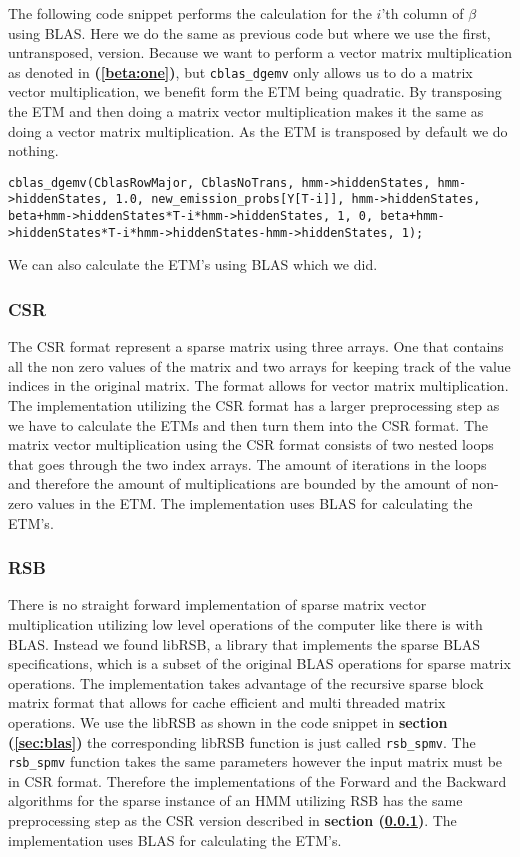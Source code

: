 The following code snippet performs the calculation for the $i$'th column of $\beta$ using BLAS. Here we do the same as previous code but where we use the first, untransposed, version. Because we want to perform a vector matrix multiplication as denoted in \textbf{(\ref{beta:one})}, but \texttt{cblas\_dgemv} only allows us to do a matrix vector multiplication, we benefit form the ETM being quadratic. By transposing the ETM and then doing a matrix vector multiplication makes it the same as doing a vector matrix multiplication. As the ETM is transposed by default we do nothing.
\begin{lstlisting}[style=CStyle]
cblas_dgemv(CblasRowMajor, CblasNoTrans, hmm->hiddenStates, hmm->hiddenStates, 1.0, new_emission_probs[Y[T-i]], hmm->hiddenStates, beta+hmm->hiddenStates*T-i*hmm->hiddenStates, 1, 0, beta+hmm->hiddenStates*T-i*hmm->hiddenStates-hmm->hiddenStates, 1);
\end{lstlisting}

We can also calculate the ETM's using BLAS which we did.

\subsubsection{CSR}\label{sec:csr}

The CSR format represent a sparse matrix using three arrays. One that contains all the non zero values of the matrix and two arrays for keeping track of the value indices in the original matrix. The format allows for vector matrix multiplication. The implementation utilizing the CSR format has a larger preprocessing step as we have to calculate the ETMs and then turn them into the CSR format. The matrix vector multiplication using the CSR format consists of two nested loops that goes through the two index arrays. The amount of iterations in the loops and therefore the amount of multiplications are bounded by the amount of non-zero values in the ETM. The implementation uses BLAS for calculating the ETM's.

\subsubsection{RSB}
There is no straight forward implementation of sparse matrix vector multiplication utilizing low level operations of the computer like there is with BLAS. Instead we found libRSB\cite{librsb}, a library that implements the sparse BLAS specifications, which is a subset of the original BLAS operations for sparse matrix operations. The implementation takes advantage of the recursive sparse block matrix format that allows for cache efficient and multi threaded matrix operations. We use the libRSB as shown in the code snippet in \textbf{section (\ref{sec:blas})} the corresponding libRSB function is just called \texttt{rsb\_spmv}. The \texttt{rsb\_spmv} function takes the same parameters however the input matrix must be in CSR format. Therefore the implementations of the Forward and the Backward algorithms for the sparse instance of  an HMM utilizing RSB has the same preprocessing step as the CSR version described in \textbf{section (\ref{sec:csr})}. The implementation uses BLAS for calculating the ETM's.

